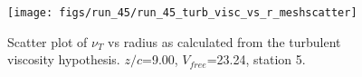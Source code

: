 \begin{figure}[H]
\centering
\texttt{[image: figs/run\_45/run\_45\_turb\_visc\_vs\_r\_meshscatter]}
\caption{Scatter plot of $\nu_T$ vs radius as calculated from the turbulent viscosity hypothesis. $z/c$=9.00, $V_{free}$=23.24, station 5.}
\label{fig:run_45_turb_visc_vs_r_meshscatter}
\end{figure}


